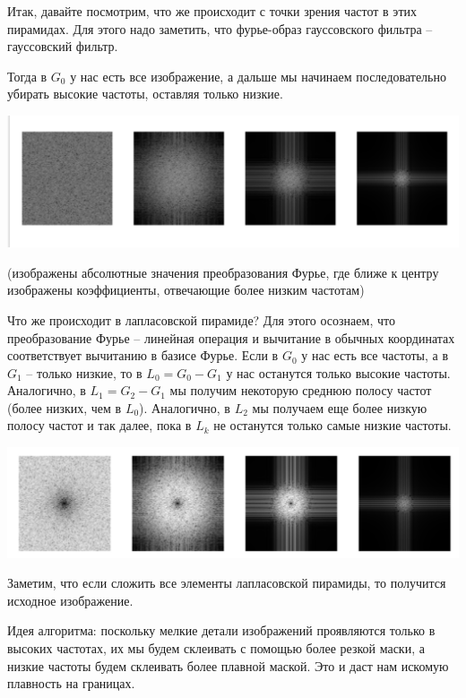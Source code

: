 \documentclass[]{book}
\theoremstyle{definition}
\begin{document}
Итак, давайте посмотрим, что же происходит с точки зрения частот в этих пирамидах. Для этого надо заметить, что фурье-образ гауссовского фильтра -- гауссовский фильтр.

Тогда в $G_0$ у нас есть все изображение, а дальше мы начинаем последовательно убирать высокие частоты, оставляя только низкие.


\begin{center}
    \includegraphics[scale=0.4]{images/G.png} 

    (изображены абсолютные значения преобразования Фурье, где ближе к центру изображены коэффициенты, отвечающие более низким частотам)
\end{center}


Что же происходит в лапласовской пирамиде? Для этого осознаем, что преобразование Фурье -- линейная операция и вычитание в обычных координатах соответствует вычитанию в базисе Фурье. Если в $G_0$ у нас есть все частоты, а в $G_1$ -- только низкие, то в $L_0 = G_0 - G_1$ у нас останутся только высокие частоты. Аналогично, в $L_1 = G_2 - G_1$ мы получим некоторую среднюю полосу частот (более низких, чем в $L_0$). Аналогично, в $L_2$ мы получаем еще более низкую полосу частот и так далее, пока в $L_k$ не останутся только самые низкие частоты.

\begin{center}
    \includegraphics[scale=0.4]{images/L.png}
\end{center}

Заметим, что если сложить все элементы лапласовской пирамиды, то получится исходное изображение.

Идея алгоритма: поскольку мелкие детали изображений проявляются только в высоких частотах, их мы будем склеивать с помощью более резкой маски, а низкие частоты будем склеивать более плавной маской. Это и даст нам искомую плавность на границах.
\end{document}
